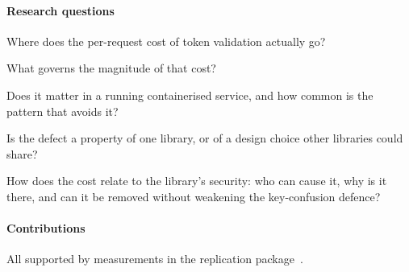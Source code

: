 \documentclass[preprint,12pt,authoryear]{elsarticle}
\begin{document}
\paragraph{Research questions}
\begin{list}{}{\setlength{\labelwidth}{2.2em}\setlength{\labelsep}{0.5em}%
  \setlength{\leftmargin}{2.7em}\setlength{\itemsep}{1pt}\setlength{\topsep}{2pt}%
  \setlength{\parsep}{0pt}\renewcommand{\makelabel}[1]{\textbf{#1}\hfill}}
\item[RQ1] Where does the per-request cost of token validation actually go?
\item[RQ2] What governs the magnitude of that cost?
\item[RQ3] Does it matter in a running containerised service, and how common is the
  pattern that avoids it?
\item[RQ4] Is the defect a property of one library, or of a design choice
  other libraries could share?
\item[RQ5] How does the cost relate to the library's security: who can cause
  it, why is it there, and can it be removed without weakening the
  key-confusion defence?
\end{list}

\paragraph{Contributions} All supported by measurements in the replication
package~\citep{artifact2026}.
\end{document}
